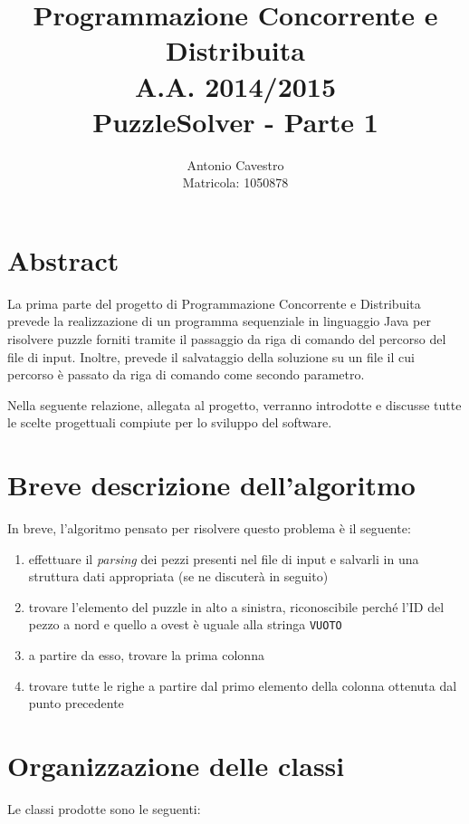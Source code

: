 \documentclass[a4paper, 12pt]{article}
\title{Programmazione Concorrente e Distribuita \\ A.A. 2014/2015 \\ \vspace{2 mm} {\small PuzzleSolver - Parte 1}}
\author{Antonio Cavestro \\ \vspace{2 mm} {\small Matricola: 1050878}}
\date{}
\begin{document}
	
  \maketitle

  \section{Abstract}

    La prima parte del progetto di Programmazione Concorrente e Distribuita prevede la realizzazione di un programma sequenziale in linguaggio Java per risolvere puzzle forniti tramite il passaggio da riga di comando del percorso del file di input. Inoltre, prevede il salvataggio della soluzione su un file il cui percorso è passato da riga di comando come secondo parametro.

    Nella seguente relazione, allegata al progetto, verranno introdotte e discusse tutte le scelte progettuali compiute per lo sviluppo del software.

  \section{Breve descrizione dell'algoritmo}

    In breve, l'algoritmo pensato per risolvere questo problema è il seguente:

    \begin{enumerate}

      \item effettuare il \emph{parsing} dei pezzi presenti nel file di input e salvarli in una struttura dati appropriata (se ne discuterà in seguito)
      \item trovare l'elemento del puzzle in alto a sinistra, riconoscibile perché l'ID del pezzo a nord e quello a ovest è uguale alla stringa \verb|VUOTO|
      \item a partire da esso, trovare la prima colonna
      \item trovare tutte le righe a partire dal primo elemento della colonna ottenuta dal punto precedente

    \end{enumerate}

	\section{Organizzazione delle classi}

    Le classi prodotte sono le seguenti:
\end{document}
